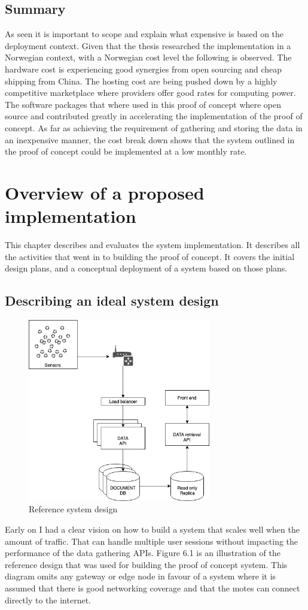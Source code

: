 \documentclass[]{uiophd}
\begin{document}
\section{Summary}
As seen it is important to scope and explain what expensive is based on the deployment context. Given that the thesis researched the implementation in a Norwegian context, with a Norwegian cost level the following is observed. The hardware cost is experiencing good synergies from open sourcing and cheap shipping from China. The hosting cost are being pushed down by a highly competitive marketplace where providers offer good rates for computing power. The software packages that where used in this proof of concept where open source and contributed greatly in accelerating the implementation of the proof of concept. As far as achieving the requirement of gathering and storing the data in an inexpensive manner, the cost break down shows that the system outlined in the proof of concept could be implemented at a low monthly rate.


\chapter{Overview of a proposed implementation}

This chapter describes and evaluates the system implementation. It describes all the activities that went in to building the proof of concept. It covers the initial design plans, and a conceptual deployment of a system based on those plans.

\section{Describing an ideal system design}
\begin{figure}[h]
\caption{Reference system design}
\centering
\includegraphics[width=8cm]{ideal_system_design.png}

\end{figure}
Early on I had a clear vision on how to build a system that scales well when the amount of traffic. That can handle multiple user sessions without impacting the performance of the data gathering APIs. Figure 6.1 is an illustration of the reference design that was used for building the proof of concept system. This diagram omits any gateway or edge node in favour of a system where it is assumed that there is good networking coverage and that the motes can connect directly to the internet.
\\\\
\end{document}
